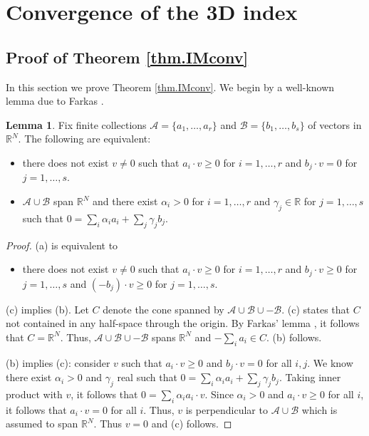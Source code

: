 \documentclass[12pt]{amsart}
\theoremstyle{definition}
\newtheorem{lemma}[theorem]{Lemma}
\def\BR{\mathbb R}
\def\calA{\mathcal A}
\def\calB{\mathcal B}
\def\a{\alpha}
\def\ga{\gamma}
\def\calB{\mathcal{B}}
\numberwithin{equation}{section}
\begin{document}

\section{Convergence of the 3D index}
\label{sec.convergence}

\subsection{Proof of Theorem \ref{thm.IMconv}}
\label{sub.pf.thm.IMconv}

In this section we prove Theorem \ref{thm.IMconv}.
We begin by a well-known lemma due to Farkas \cite{Ziegler}.

\begin{lemma}
\label{lem.farkas}
Fix finite collections $\calA=\{a_1,\dots,a_r\}$ and
$\calB=\{b_1,\dots,b_s\}$ of vectors in $\BR^N$. 
The following are equivalent:
\begin{itemize}
\item[(a)] there does not exist $v \neq 0$ such that $a_i \cdot v \geq 0$ 
for $i=1,\dots,r$ and $b_j \cdot v =0$ for $j=1,\dots,s$.
\item[(b)] $\calA \cup \calB$ span $\BR^N$ and there exist $\a_i >0$
for $i=1,\dots,r$ and $\ga_j \in \BR$ for $j=1,\dots,s$ such that 
$0=\sum_i \a_i a_i + \sum_j \ga_j b_j$.
\end{itemize}
\end{lemma}

\begin{proof}
(a) is equivalent to 

\begin{itemize}
\item[(c)]  there does not exist $v \neq 0$ such that $a_i \cdot v \geq 0$ 
for $i=1,\dots,r$ and $b_j \cdot v \geq 0$ for $j=1,\dots,s$ and
$(-b_j) \cdot v \geq 0$ for $j=1,\dots,s$.
\end{itemize}
(c) implies (b).
Let $C$ denote the cone spanned by $\calA \cup \calB \cup -\calB$.
(c) states that $C$ not contained in any half-space through the
origin. By Farkas' lemma \cite{Ziegler}, it follows that $C=\BR^N$. Thus,
$\calA \cup \calB \cup -\calB$ spans $\BR^N$ and $-\sum_i a_i \in C$.
(b) follows.

(b) implies (c): consider $v$ such that $a_i \cdot v \geq 0$ and $b_j \cdot
v =0$ for all $i,j$. We know there exist $\a_i>0$ and $\ga_j$ real such that
 $0=\sum_i \a_i a_i + \sum_j \ga_j b_j$. Taking inner product with $v$,
it follows that $0=\sum_i \a_i a_i \cdot v$. Since $\a_i >0$ and $ a_i \cdot v
\geq 0$ for all $i$, it follows that $ a_i \cdot v =0$ for all $i$. Thus,
$v$ is perpendicular to $\calA \cup \calB$ which is assumed to span $\BR^N$.
Thus $v=0$ and (c) follows.
\end{proof}
\end{document}
